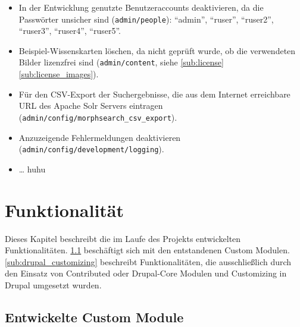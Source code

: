 \begin{itemize}
	\item In der Entwicklung genutzte Benutzeraccounts deaktivieren, da die Passwörter unsicher sind (\lstinline|admin/people|): \enquote{admin}, \enquote{ruser}, \enquote{ruser2}, \enquote{ruser3}, \enquote{ruser4}, \enquote{ruser5}.

	\item Beispiel-Wissenskarten löschen, da nicht geprüft wurde, ob die verwendeten Bilder lizenzfrei sind (\lstinline|admin/content|, siehe \cref*{sub:license} \cref{sub:license_images}).

	\item Für den CSV-Export der Suchergebnisse, die aus dem Internet erreichbare URL des Apache Solr Servers eintragen (\lstinline|admin/config/morphsearch_csv_export|).

	\item Anzuzeigende Fehlermeldungen deaktivieren (\lstinline|admin/config/development/logging|).

	\item \dots {}
    huhu
\end{itemize}



\newpage
\section{Funktionalität}\label{sec:function}
Dieses Kapitel beschreibt die im Laufe des Projekts entwickelten Funktionalitäten. \cref{sub:custom_modules} beschäftigt sich mit den entstandenen Custom Modulen. \cref{sub:drupal_customizing} beschreibt Funktionalitäten, die ausschließlich durch den Einsatz von Contributed oder Drupal-Core Modulen und Customizing in Drupal umgesetzt wurden.


\subsection{Entwickelte Custom Module}\label{sub:custom_modules}


